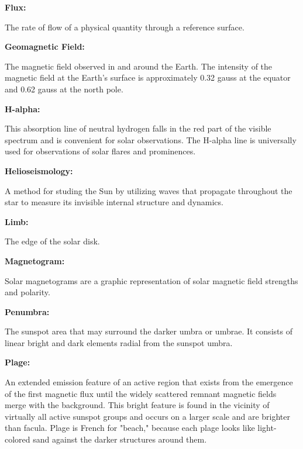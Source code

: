 \textbf{Flux:}
\begin{myindentpar}{1cm}
  The rate of flow of a physical quantity through a reference surface.
\end{myindentpar}

\textbf{Geomagnetic Field:}
\begin{myindentpar}{1cm}
  The magnetic field observed in and around the Earth. The intensity of the magnetic field at the Earth's surface is approximately 0.32 gauss at the equator and 0.62 gauss at the north pole.
\end{myindentpar}

\textbf{H-alpha:}
\begin{myindentpar}{1cm}
  This absorption line of neutral hydrogen falls in the red part of the visible spectrum and is convenient for solar observations. The H-alpha line is universally used for observations of solar flares and prominences.
\end{myindentpar}

\textbf{Helioseismology:}
\begin{myindentpar}{1cm}
  A method for studing the Sun by utilizing waves that propagate throughout the star to measure its invisible internal structure and dynamics.
\end{myindentpar}

\textbf{Limb:}
\begin{myindentpar}{1cm}
  The edge of the solar disk.
\end{myindentpar}

\textbf{Magnetogram:}
\begin{myindentpar}{1cm}
  Solar magnetograms are a graphic representation of solar magnetic field strengths and polarity.
\end{myindentpar}

\textbf{Penumbra:}
\begin{myindentpar}{1cm}
  The sunspot area that may surround the darker umbra or umbrae. It consists of linear bright and dark elements radial from the sunspot umbra.
\end{myindentpar}

\textbf{Plage:}
\begin{myindentpar}{1cm}
 An extended emission feature of an active region that exists from the emergence of the first magnetic flux until the widely scattered remnant magnetic fields merge with the background. This bright feature is found in the vicinity of virtually all active sunspot groups and occurs on a larger scale and are brighter than facula. Plage is French for "beach," because each plage looks like light-colored sand against the darker structures around them.
\end{myindentpar}

